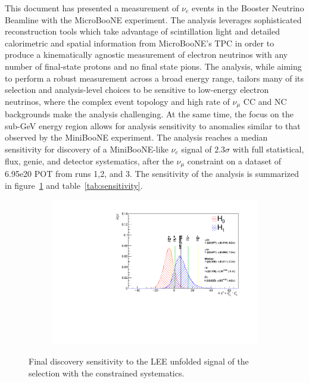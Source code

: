 \label{sec:conclusions}
\par This document has presented a measurement of $\nu_e$ events in the Booster Neutrino Beamline with the MicroBooNE experiment. The analysis leverages sophisticated reconstruction tools which take advantage of scintillation light and detailed calorimetric and spatial information from MicroBooNE's TPC in order to produce a kinematically agnostic measurement of electron neutrinos with any number of final-state protons and no final state pions. The analysis, while aiming to perform a robust measurement across a broad energy range, tailors many of its selection and analysis-level choices to be sensitive to low-energy electron neutrinos, where the complex event topology and high rate of $\nu_{\mu}$ CC and NC backgrounds make the analysis challenging. At the same time, the focus on the sub-GeV energy region allows for analysis sensitivity to anomalies similar to that observed by the MiniBooNE experiment. The analysis reaches a median sensitivity for discovery of a MiniBooNE-like $\nu_e$ signal of $2.3\sigma$ with full statistical, flux, genie, and detector systematics, after the $\nu_{\mu}$ constraint on a dataset of 6.95e20 POT from runs 1,2, and 3. The sensitivity of the analysis is summarized in figure~\ref{fig:sensitivity_bdt_loose_const:conclusions} and table~\ref{tab:sensitivity}.

\begin{figure}[H]
    \begin{center}
    \begin{subfigure}{0.55\textwidth}
    \includegraphics[width=1.00\textwidth]{Sensitivity/sensitivity-run123/SBNfit_Cls_nue_1e0p_numu_reco_e_H1_mc_collab_syst_detsysCNP_Chi.pdf}
    \end{subfigure}
    \caption{\label{fig:sensitivity_bdt_loose_const:conclusions}Final discovery sensitivity to the LEE unfolded signal of the \npsel selection with the constrained systematics.}
    \end{center}
\end{figure}

